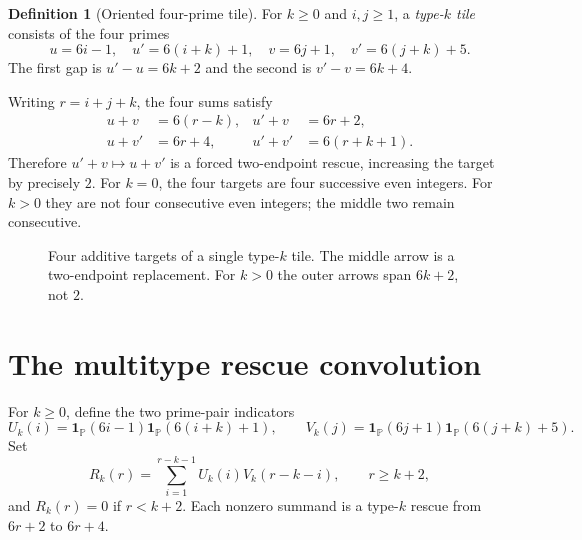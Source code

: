 \documentclass[11pt,a4paper]{article}
\theoremstyle{definition}
\newtheorem{definition}[theorem]{Definition}
\theoremstyle{remark}
\newcommand{\PP}{\mathbb P}
\newcommand{\ind}{\mathbf 1}
\begin{document}
\begin{definition}[Oriented four-prime tile]
For $k\ge0$ and $i,j\ge1$, a \emph{type-$k$ tile} consists of the four primes
\begin{equation}\label{eq:tile-primes}
 u=6i-1,\quad u'=6(i+k)+1,\quad
 v=6j+1,\quad v'=6(j+k)+5.
\end{equation}
The first gap is $u'-u=6k+2$ and the second is $v'-v=6k+4$.
\end{definition}
Writing $r=i+j+k$, the four sums satisfy
\begin{equation}\label{eq:tile-targets}
 \begin{aligned}
 u+v&=6(r-k), &u'+v&=6r+2,\\
 u+v'&=6r+4, &u'+v'&=6(r+k+1).
 \end{aligned}
\end{equation}
Therefore $u'+v\mapsto u+v'$ is a forced two-endpoint rescue, increasing the target by precisely $2$.  For $k=0$, the four targets are four successive even integers.  For $k>0$ they are not four consecutive even integers; the middle two remain consecutive.

\begin{figure}[ht]
\centering
{}
\caption{Four additive targets of a single type-$k$ tile.  The middle arrow is a two-endpoint replacement.  For $k>0$ the outer arrows span $6k+2$, not $2$.}
\label{fig:tile}
\end{figure}

\section{The multitype rescue convolution}
For $k\ge0$, define the two prime-pair indicators
\begin{equation}\label{eq:UV}
 U_k(i)=\ind_{\PP}(6i-1)\ind_{\PP}(6(i+k)+1),\qquad
 V_k(j)=\ind_{\PP}(6j+1)\ind_{\PP}(6(j+k)+5).
\end{equation}
Set
\begin{equation}\label{eq:R}
 R_k(r)=\sum_{i=1}^{r-k-1}U_k(i)V_k(r-k-i),\qquad r\ge k+2,
\end{equation}
and $R_k(r)=0$ if $r<k+2$.  Each nonzero summand is a type-$k$ rescue from $6r+2$ to $6r+4$.
\end{document}
